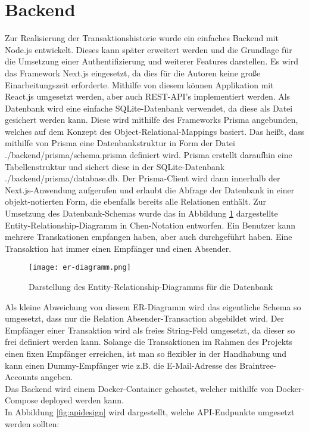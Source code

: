 \section{Backend}

Zur Realisierung der Transaktionshistorie wurde ein einfaches Backend mit Node.js entwickelt.
Dieses kann später erweitert werden und die Grundlage für die Umsetzung einer Authentifizierung und weiterer Features darstellen.
Es wird das Framework Next.js eingesetzt, da dies für die Autoren keine große Einarbeitungszeit erforderte.
Mithilfe von diesem können Applikation mit React.js umgesetzt werden, aber auch REST-API's implementiert werden.
Als Datenbank wird eine einfache SQLite-Datenbank verwendet, da diese als Datei gesichert werden kann.
Diese wird mithilfe des Frameworks Prisma angebunden, welches auf dem Konzept des Object-Relational-Mappings basiert.
Das heißt, dass mithilfe von Prisma eine Datenbankstruktur in Form der Datei ./backend/prisma/schema.prisma definiert wird.
Prisma erstellt daraufhin eine Tabellenstruktur und sichert diese in der SQLite-Datenbank ./backend/prisma/database.db.
Der Prisma-Client wird dann innerhalb der Next.js-Anwendung aufgerufen und erlaubt die Abfrage der Datenbank in einer objekt-notierten Form, die ebenfalls bereits alle Relationen enthält.
Zur Umsetzung des Datenbank-Schemas wurde das in Abbildung \ref{fig:er_diagramm} dargestellte Entity-Relationship-Diagramm in Chen-Notation entworfen.
Ein Benutzer kann mehrere Transkationen empfangen haben, aber auch durchgeführt haben.
Eine Transaktion hat immer einen Empfänger und einen Absender.

\begin{figure}[H]
  \centering
  \texttt{[image: er-diagramm.png]}
  \label{fig:er_diagramm}
  \caption{Darstellung des Entity-Relationship-Diagramms für die Datenbank}
\end{figure}

Als kleine Abweichung von diesem ER-Diagramm wird das eigentliche Schema so umgesetzt, dass nur die Relation Absender-Transaction abgebildet wird.
Der Empfänger einer Transaktion wird als freies String-Feld umgesetzt, da dieser so frei definiert werden kann.
Solange die Transaktionen im Rahmen des Projekts einen fixen Empfänger erreichen, ist man so flexibler in der Handhabung und kann einen Dummy-Empfänger wie z.B. die E-Mail-Adresse des Braintree-Accounts angeben.
\\
Das Backend wird einem Docker-Container gehostet, welcher mithilfe von Docker-Compose deployed werden kann.
\\
In Abbildung \ref{fig:apidesign} wird dargestellt, welche API-Endpunkte umgesetzt werden sollten:

